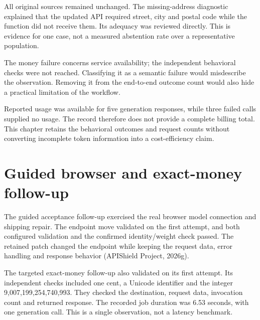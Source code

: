 \documentclass[12pt,a4paper,oneside]{report}
\begin{document}
All original sources remained unchanged. The missing-address diagnostic explained that the updated API required street, city and postal code while the function did not receive them. Its adequacy was reviewed directly. This is evidence for one case, not a measured abstention rate over a representative population.

The money failure concerns service availability; the independent behavioral checks were not reached. Classifying it as a semantic failure would misdescribe the observation. Removing it from the end-to-end outcome count would also hide a practical limitation of the workflow.

Reported usage was available for five generation responses, while three failed calls supplied no usage. The record therefore does not provide a complete billing total. This chapter retains the behavioral outcomes and request counts without converting incomplete token information into a cost-efficiency claim.

\section{Guided browser and exact-money follow-up}

The guided acceptance follow-up exercised the real browser model connection and shipping repair. The endpoint move validated on the first attempt, and both configured validation and the confirmed identity/weight check passed. The retained patch changed the endpoint while keeping the request data, error handling and response behavior (APIShield Project, 2026g).

The targeted exact-money follow-up also validated on its first attempt. Its independent checks included one cent, a Unicode identifier and the integer 9,007,199,254,740,993. They checked the destination, request data, invocation count and returned response. The recorded job duration was 6.53 seconds, with one generation call. This is a single observation, not a latency benchmark.
\end{document}
